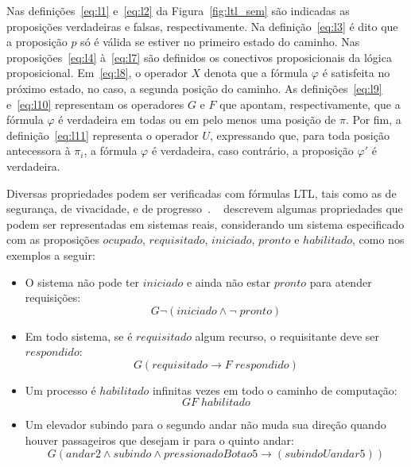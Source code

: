 Nas definições~\ref{eq:l1} e~\ref{eq:l2} da Figura~\ref{fig:ltl_sem} são indicadas as proposições verdadeiras e falsas, respectivamente. Na definição~\ref{eq:l3} é dito que a proposição $p$ só é válida se estiver no primeiro estado do caminho. Nas proposições~\ref{eq:l4} à~\ref{eq:l7} são definidos os conectivos proposicionais da lógica proposicional. Em~\ref{eq:l8}, o operador $X$ denota que a fórmula $\varphi$ é satisfeita no próximo estado, no caso, a segunda posição do caminho. As definições~\ref{eq:l9} e~\ref{eq:l10} representam os operadores $G$ e $F$ que apontam, respectivamente, que a fórmula $\varphi$ é verdadeira em todas ou em pelo menos uma posição de $\pi$. Por fim, a definição~\ref{eq:l11} representa o operador $U$, expressando que, para toda posição antecessora à $\pi_{i}$, a fórmula $\varphi$ é verdadeira, caso contrário, a proposição $\varphi'$ é verdadeira.

Diversas propriedades podem ser verificadas com fórmulas LTL, tais como as de segurança, de vivacidade, e de progresso~\cite{huth2004logic, mura2016}. ~ descrevem algumas propriedades que podem ser representadas em sistemas reais, considerando um sistema especificado com as proposições $ocupado$, $requisitado$, $iniciado$, $pronto$ e $habilitado$, como nos exemplos a seguir:

\begin{itemize}
	\item O sistema não pode ter $iniciado$ e ainda não estar $pronto$ para atender requisições: 
	\begin{equation}
	G\neg(iniciado\wedge\neg\;pronto)
	\end{equation} 
	\item Em todo sistema, se é $requisitado$ algum recurso, o requisitante deve ser $respondido$:
	\begin{equation}
	G(requisitado \to F\;respondido)
	\end{equation}
	\item Um processo é $habilitado$ infinitas vezes em todo o caminho de computação: 
	\begin{equation}
	GF\;habilitado 
	\end{equation}
	\item Um elevador subindo para o segundo andar não muda sua direção quando houver passageiros que desejam ir para o quinto andar: 
	\begin{equation}
	G(andar2 \wedge subindo \wedge pressionadoBotao5 \to (subindo U andar5))
	\end{equation}
\end{itemize}

